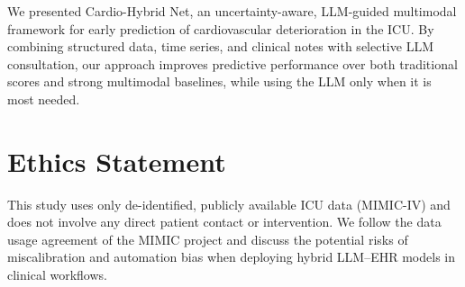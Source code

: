 \documentclass{article}
\begin{document}
We presented Cardio-Hybrid Net, an uncertainty-aware, LLM-guided multimodal framework for early prediction of cardiovascular deterioration in the ICU.
By combining structured data, time series, and clinical notes with selective LLM consultation, our approach improves predictive performance over both traditional scores and strong multimodal baselines, while using the LLM only when it is most needed.
\section*{Ethics Statement}
This study uses only de-identified, publicly available ICU data (MIMIC-IV) and does not involve any direct patient contact or intervention.
We follow the data usage agreement of the MIMIC project and discuss the potential risks of miscalibration and automation bias when deploying hybrid LLM--EHR models in clinical workflows.



\end{document}
